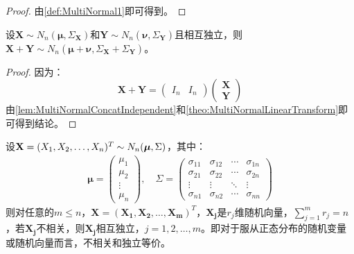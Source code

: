 \begin{proof}
	由\cref{def:MultiNormal1}即可得到。
\end{proof}
\begin{theorem}\label{theo:MultiNormalAdditivity}
	设$\mathbf{X}\sim N_n(\boldsymbol{\mu},\Sigma_\mathbf{X})$和$\mathbf{Y}\sim N_n(\boldsymbol{\nu},\Sigma_\mathbf{Y})$且相互独立，则$\mathbf{X}+\mathbf{Y}\sim N_n(\boldsymbol{\mu}+\boldsymbol{\nu},\Sigma_\mathbf{X}+\Sigma_\mathbf{Y})$。
\end{theorem}
\begin{proof}
	因为：
	\begin{equation*}
		\mathbf{X}+\mathbf{Y}=
		\begin{pmatrix}
			I_n & I_n
		\end{pmatrix}
		\begin{pmatrix}
			\mathbf{X} \\
			\mathbf{Y}
		\end{pmatrix}
	\end{equation*}
	由\cref{lem:MultiNormalConcatIndependent}和\cref{theo:MultiNormalLinearTransform}即可得到结论。
\end{proof}
\begin{theorem}\label{theo:IndependentCorrelationNormal}
	设$\mathbf{X}=(X_1, X_2, \dots, X_{n})^T\sim N_n(\boldsymbol{\mu},\Sigma)$，其中：
	\begin{gather*}
		\boldsymbol{\mu}=
		\begin{pmatrix} 
			\mu_1 \\ 
			\mu_2 \\ 
			\vdots \\ 
			\mu_n 
		\end{pmatrix},\quad
		\Sigma=
		\begin{pmatrix}
			\sigma_{11} & \sigma_{12} & \cdots & \sigma_{1n} \\
			\sigma_{21} & \sigma_{22} & \cdots & \sigma_{2n} \\
			\vdots & \vdots & \ddots & \vdots \\
			\sigma_{n1} & \sigma_{n2} & \cdots & \sigma_{nn}
		\end{pmatrix}
	\end{gather*}
	则对任意的$m\leqslant n$，$\mathbf{X}=(\mathbf{X_1},\mathbf{X_2},\dots,\mathbf{X_m})^T$，$\mathbf{X_j}$是$r_j$维随机向量，$\sum\limits_{j=1}^{m}r_j=n$，若$\mathbf{X_j}$不相关，则$\mathbf{X_j}$相互独立，$j=1,2,\dots,m$。即对于服从正态分布的随机变量或随机向量而言，不相关和独立等价。
\end{theorem}
